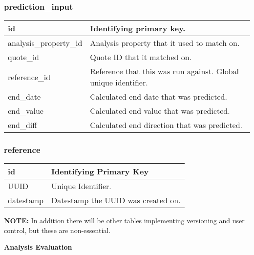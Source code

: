 \subsubsection{prediction\_input}
\begin{tabular}{|l||l|}
	\hline
	id							& Identifying primary key. \\ \hline
	analysis\_property\_id 		& Analysis property that it used to match on. \\ \hline
	quote\_id					& Quote ID that it matched on. \\ \hline
	reference\_id				& Reference that this was run against. Global unique identifier. \\ \hline
	end\_date					& Calculated end date that was predicted. \\ \hline
	end\_value					& Calculated end value that was predicted. \\ \hline
	end\_diff					& Calculated end direction that was predicted. \\ \hline
\end{tabular}



\subsubsection{reference}
\begin{tabular}{|l||l|}
	\hline
	id						& Identifying Primary Key \\ \hline
	UUID					& Unique Identifier. \\ \hline
	datestamp				& Datestamp the UUID was created on. \\ \hline
\end{tabular}

\textbf{NOTE:} In addition there will be other tables implementing versioning and user control, but these are non-essential.



\par \textbf{Analysis Evaluation}
